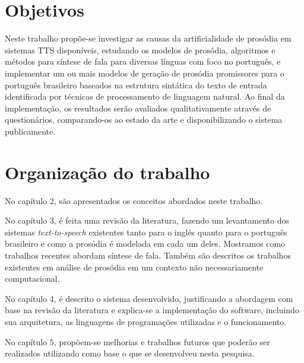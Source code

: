 \section{Objetivos}
Neste trabalho propõe-se investigar as causas da artificialidade de prosódia em sistemas TTS disponíveis, estudando os modelos de prosódia, algoritmos e métodos para síntese de fala para diversas línguas com foco no português, e implementar um ou mais modelos de geração de prosódia promissores para o português brasileiro baseados na estrutura sintática do texto de entrada identificada por técnicas de processamento de linguagem natural. Ao final da implementação, os resultados serão avaliados qualitativamente através de questionários, comparando-os ao estado da arte e disponibilizando o sistema publicamente.

\section{Organização do trabalho}

No capítulo 2, são apresentados os conceitos abordados neste trabalho.


No capítulo 3, é feita uma revisão da literatura, fazendo um levantamento dos
sistemas \emph{text-to-speech} existentes tanto para o inglês quanto para o
português brasileiro e como a prosódia é modelada em cada um deles. Mostramos
como trabalhos recentes abordam síntese de fala. Também são descritos os
trabalhos existentes em análise de prosódia em um contexto não necessariamente
computacional.

No capítulo 4, é descrito o sistema desenvolvido, justificando a abordagem com
base na revisão da literatura e explica-se a implementação do software,
incluindo sua arquitetura, as linguagens de programações utilizadas e o
funcionamento.

No capítulo 5,
propõem-se melhorias e trabalhos futuros que poderão ser realizados utilizando
como base o que se desenvolveu nesta pesquisa.